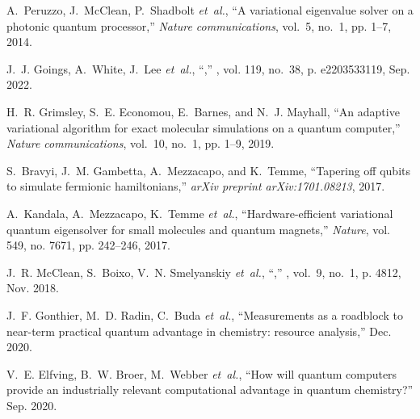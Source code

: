 \documentclass[journal,onecolumn]{IEEEtran}
\begin{document}
\begin{thebibliography}{48}
A.~Peruzzo, J.~McClean, P.~Shadbolt \emph{et~al.}, ``A variational eigenvalue
  solver on a photonic quantum processor,'' \emph{Nature communications},
  vol.~5, no.~1, pp. 1--7, 2014.

J.~J. Goings, A.~White, J.~Lee \emph{et~al.},
  ``,'' \emph{}, vol. 119, no.~38, p. e2203533119, Sep. 2022.

H.~R. Grimsley, S.~E. Economou, E.~Barnes, and N.~J. Mayhall, ``An adaptive
  variational algorithm for exact molecular simulations on a quantum
  computer,'' \emph{Nature communications}, vol.~10, no.~1, pp. 1--9, 2019.

S.~Bravyi, J.~M. Gambetta, A.~Mezzacapo, and K.~Temme, ``Tapering off qubits to
  simulate fermionic hamiltonians,'' \emph{arXiv preprint arXiv:1701.08213},
  2017.

A.~Kandala, A.~Mezzacapo, K.~Temme \emph{et~al.}, ``Hardware-efficient
  variational quantum eigensolver for small molecules and quantum magnets,''
  \emph{Nature}, vol. 549, no. 7671, pp. 242--246, 2017.

J.~R. McClean, S.~Boixo, V.~N. Smelyanskiy \emph{et~al.},
  ``,'' \emph{}, vol.~9, no.~1,
  p. 4812, Nov. 2018.

J.~F. Gonthier, M.~D. Radin, C.~Buda \emph{et~al.}, ``Measurements as a
  roadblock to near-term practical quantum advantage in chemistry: resource
  analysis,'' Dec. 2020.

V.~E. Elfving, B.~W. Broer, M.~Webber \emph{et~al.}, ``How will quantum
  computers provide an industrially relevant computational advantage in quantum
  chemistry?'' Sep. 2020.


\end{thebibliography}
\end{document}
